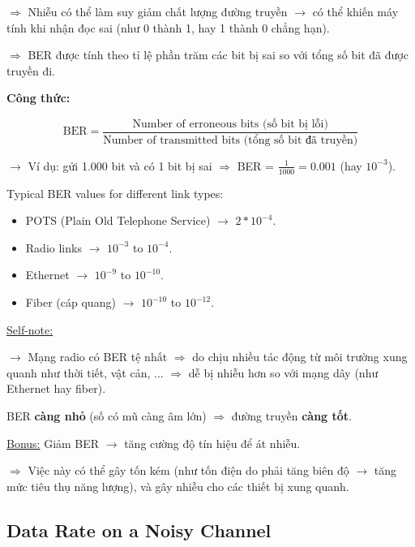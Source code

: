 $\Rightarrow$ Nhiễu có thể làm suy giảm chất lượng đường truyền $\rightarrow$ có thể khiến máy tính khi nhận đọc sai (như 0 thành 1, hay 1 thành 0 chẳng hạn).
\medskip

\noindent
$\Rightarrow$ BER được tính theo tỉ lệ phần trăm các bit bị sai so với tổng số bit đã được truyền đi.
\medskip

\noindent
\textbf{Công thức:}

\begin{equation*}
    \text{BER} = \frac{\text{Number of erroneous bits (số bit bị lỗi)}}{\text{Number of transmitted bits (tổng số bit đã truyền)}}
\end{equation*}
\medskip

\noindent
$\rightarrow$ Ví dụ: gửi 1.000 bit và có 1 bit bị sai $\Rightarrow$ BER = $\frac{1}{1000} = 0.001$ (hay $10^{-3}$).

\vspace{0.5cm}

\noindent
Typical BER values for different link types:

\begin{itemize}
    \item POTS (Plain Old Telephone Service) $\rightarrow$ $2*10^{-4}$.
    \item Radio links $\rightarrow$ $10^{-3}$ to $10^{-4}$.
    \item Ethernet $\rightarrow$ $10^{-9}$ to $10^{-10}$.
    \item Fiber (cáp quang) $\rightarrow$ $10^{-10}$ to $10^{-12}$.
\end{itemize}
\medskip

\noindent
\underline{Self-note:}
\medskip

\noindent
$\rightarrow$ Mạng radio có BER tệ nhất $\Rightarrow$ do chịu nhiều tác động từ môi trường xung quanh như thời tiết, vật cản, ... $\Rightarrow$ dễ bị nhiễu hơn so với mạng dây (như Ethernet hay fiber).
\medskip

\noindent
BER \textbf{càng nhỏ} (số có mũ càng âm lớn) $\Rightarrow$ đường truyền \textbf{càng tốt}.
\medskip

\noindent
\underline{Bonus:} Giảm BER $\rightarrow$ tăng cường độ tín hiệu để át nhiễu. 

$\Rightarrow$ Việc này có thể gây tốn kém (như tốn điện do phải tăng biên độ $\rightarrow$ tăng mức tiêu thụ năng lượng), và gây nhiễu cho các thiết bị xung quanh.
\medskip

\subsection{Data Rate on a Noisy Channel}

